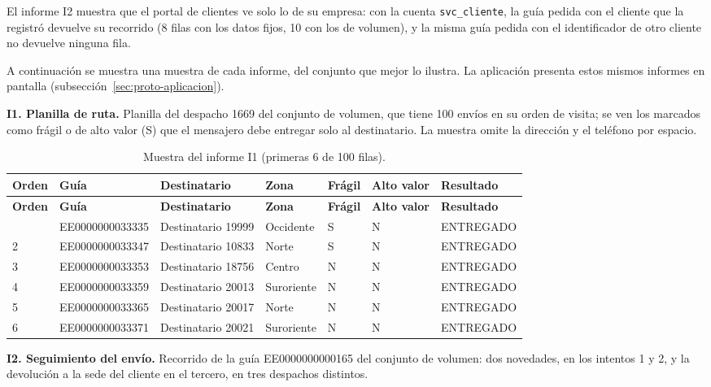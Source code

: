 El informe I2 muestra que el portal de clientes ve solo lo de su empresa:
con la cuenta \texttt{svc\_\allowbreak cliente}, la guía pedida con el cliente que la
registró devuelve su recorrido (8 filas con los datos fijos, 10 con los
de volumen), y la misma guía pedida con el identificador de otro cliente
no devuelve ninguna fila.

A continuación se muestra una muestra de cada informe, del conjunto que
mejor lo ilustra. La aplicación presenta estos mismos informes en
pantalla (subsección~\ref{sec:proto-aplicacion}).

\textbf{I1. Planilla de ruta.} Planilla del despacho 1669 del conjunto de
volumen, que tiene 100 envíos en su orden de visita; se ven los marcados
como frágil o de alto valor (S) que el mensajero debe entregar solo al
destinatario. La muestra omite la dirección y el teléfono por espacio.

{\singlespacing\footnotesize
\begin{longtable}{L{1.1cm} L{2.6cm} L{2.6cm} L{1.8cm} L{1.0cm} L{1.3cm} L{2.2cm}}
\caption{Muestra del informe I1 (primeras 6 de 100 filas).}
\label{tab:proto-i1}\\
\toprule
\textbf{Orden} & \textbf{Guía} & \textbf{Destinatario} & \textbf{Zona} & \textbf{Frágil} & \textbf{Alto valor} & \textbf{Resultado} \\
\midrule
\endfirsthead
\toprule
\textbf{Orden} & \textbf{Guía} & \textbf{Destinatario} & \textbf{Zona} & \textbf{Frágil} & \textbf{Alto valor} & \textbf{Resultado} \\
\midrule
\endhead
\bottomrule
{} & EE0000000033335 & Destinatario 19999 & Occidente & S & N & ENTREGADO \\
2 & EE0000000033347 & Destinatario 10833 & Norte & S & N & ENTREGADO \\
3 & EE0000000033353 & Destinatario 18756 & Centro & N & N & ENTREGADO \\
4 & EE0000000033359 & Destinatario 20013 & Suroriente & N & N & ENTREGADO \\
5 & EE0000000033365 & Destinatario 20017 & Norte & N & N & ENTREGADO \\
6 & EE0000000033371 & Destinatario 20021 & Suroriente & N & N & ENTREGADO \\
\end{longtable}
\par}

\textbf{I2. Seguimiento del envío.} Recorrido de la guía
EE0000000000165 del conjunto de volumen: dos novedades, en los intentos 1 y
2, y la devolución a la sede del cliente en el tercero, en tres despachos
distintos.

